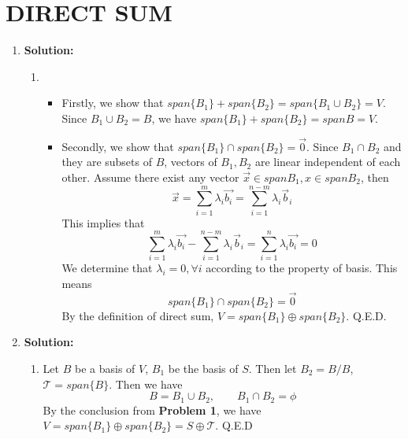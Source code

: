 \section{DIRECT SUM}
\begin{enumerate}
	\item \textbf{Solution:}
	\begin{enumerate}
		\item 
		\begin{itemize}
		\item Firstly, we show that $span\{B_1\}  + span\{B_2\} = span\{B_1\cup B_2\} = V$. Since $B_1\cup B_2 = B$, we have $span\{B_1\}  + span\{B_2\} = span{B} = V$.
		\item Secondly, we show that $span\{B_1\} \cap span\{B_2\} = \vec{0}$. Since $B_1 \cap B_2$ and they are subsets of $B$, vectors of $B_1,B_2$ are linear independent of each other. Assume there exist any vector $\vec{x}\in span{B_1},x\in span{B_2}$, then 
		$$\vec{x}=\sum_{i=1}^m\lambda_i\vec{b_i} = \sum_{i=1}^{n-m}\lambda_i\vec{b}_i$$
		This implies that 
		$$\sum_{i=1}^m\lambda_i\vec{b_i}-\sum_{i=1}^{n-m} \lambda_i\vec{b}_i = \sum_{i=1}^n\lambda_i\vec{b_i}=0$$
		We determine that $\lambda_i=0,\forall i$ according to the property of basis. This means
		$$span\{B_1\}\cap span\{B_2\}=\vec{0}$$
		By the definition of direct sum, $V=span\{B_1\}\oplus span\{B_2\}$. Q.E.D.

		\end{itemize}
	\end{enumerate}
	\item \textbf{Solution:}
	\begin{enumerate}
		\item Let $B$ be a basis of $V$, $B_1$ be the basis of $S$. Then let $B_2=B/B$, $\mathcal{T}=span\{B\}$. Then we have
		$$B=B_1\cup B_2,\qquad B_1\cap B_2=\phi$$
		By the conclusion from \textbf{Problem 1}, we have $V=span\{B_1\}\oplus span\{B_2\}=S\oplus\mathcal{T}$.
		Q.E.D
	\end{enumerate}
\end{enumerate}